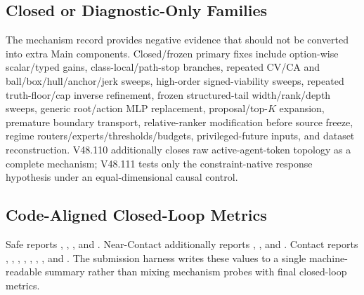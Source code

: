 \documentclass[conference]{IEEEtran}
\begin{document}
\subsection{Closed or Diagnostic-Only Families}
The mechanism record provides negative evidence that should not be converted into extra Main components. Closed/frozen primary fixes include option-wise scalar/typed gains, class-local/path-stop branches, repeated CV/CA and ball/box/hull/anchor/jerk sweeps, high-order signed-viability sweeps, repeated truth-floor/cap inverse refinement, frozen structured-tail width/rank/depth sweeps, generic root/action MLP replacement, proposal/top-$K$ expansion, premature boundary transport, relative-ranker modification before source freeze, regime routers/experts/thresholds/budgets, privileged-future inputs, and dataset reconstruction. V48.110 additionally closes raw active-agent-token topology as a complete mechanism; V48.111 tests only the constraint-native response hypothesis under an equal-dimensional causal control.

\subsection{Code-Aligned Closed-Loop Metrics}
\begingroup\footnotesize\sloppy
Safe reports , , , and . Near-Contact additionally reports , , and . Contact reports , , , , , , , and . The submission harness writes these values to a single machine-readable summary rather than mixing mechanism probes with final closed-loop metrics.
\endgroup



\end{document}
